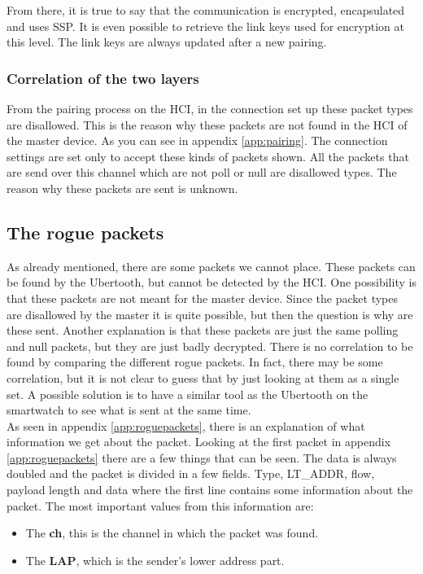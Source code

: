 From there, it is true to say that the communication is encrypted, encapsulated and uses SSP. It is even possible to retrieve the link keys used for encryption at this level. The link keys are always updated after a new pairing.

\subsubsection{Correlation of the two layers}


From the pairing process on the HCI, in the connection set up these packet types are disallowed. This is the reason why these packets are not found in the HCI of the master device. As you can see in appendix \ref{app:pairing}. The connection settings are set only to accept these kinds of packets shown. All the packets that are send over this channel which are not poll or null are disallowed types. \pend
The reason why these packets are sent is unknown. 

\subsection{The rogue packets}
As already mentioned, there are some packets we cannot place. These packets can be found by the Ubertooth, but cannot be detected by the HCI. One possibility is that these packets are not meant for the master device. Since the packet types are disallowed by the master it is quite possible, but then the question is why are these sent. Another explanation is that these packets are just the same polling and null packets, but they are just badly decrypted. There is no correlation to be found by comparing the different rogue packets. In fact, there may be some correlation, but it is not clear to guess that by just looking at them as a single set. A possible solution is to have a similar tool as the Ubertooth on the smartwatch to see what is sent at the same time. \\
As seen in appendix \ref{app:roguepackets}, there is an explanation of what information we get about the packet.
Looking at the first packet in appendix \ref{app:roguepackets} there are a few things that can be seen. The data is always doubled and the packet is divided in a few fields. Type, LT\_ADDR, flow, payload length and data where the first line contains some information about the packet. The most important values from this information are:
\begin{itemize} 
\item The \textbf{ch}, this is the channel in which the packet was found.
\item The \textbf{LAP}, which is the sender's lower address part.
\end{itemize}
